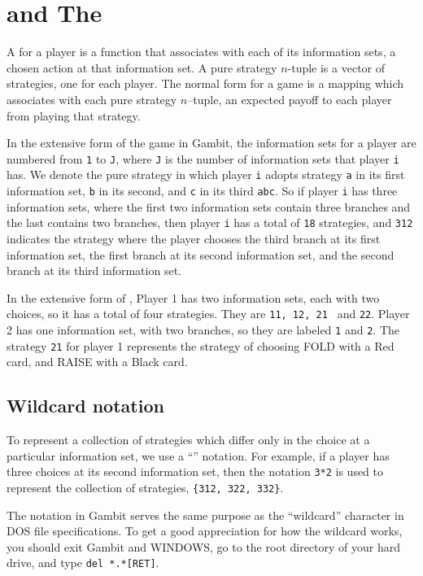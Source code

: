 \documentclass[12pt]{report}
\begin{document}
\section{ and The }

A  for a player is a function that 
associates with each of 
its information sets, a chosen action at that information set.  A pure 
strategy $n$-tuple is a vector of strategies, one for each player.  
The normal form for a game is a mapping which associates with each pure 
strategy $n$--tuple, an expected payoff to each player from 
playing that strategy. 

In the extensive form of the game in Gambit, the information sets for a 
player are numbered from \verb+1+ to \verb+J+, where \verb+J+ is the number of information 
sets that player \verb+i+ has.  We denote the pure strategy in which player \verb+i+ 
adopts strategy \verb+a+ in its first information set, \verb+b+ in its second, and 
\verb+c+ in its third \verb+abc+.  So if player \verb+i+ has three information sets, where 
the first two information sets contain three branches and the last contains 
two branches, then player \verb+i+ has a total of \verb+18+ strategies, 
and \verb+312+ indicates the strategy where the player chooses the third 
branch at its first information set, the first branch at its second 
information set, and the second branch at its third information set.  

In the extensive form of ,
Player 1 has two information sets, each with two choices, so it has a
total of four strategies.  They are {\tt 11, 12, 21 } and {\tt 22}.
Player 2 has one information set, with two branches, so they are
labeled {\tt 1} and {\tt 2}.  The strategy {\tt 21} for player 1
represents the strategy of choosing FOLD with a Red card, and RAISE
with a Black card.
 
\subsection{Wildcard notation}
To represent a collection of strategies which differ only in the choice at
a particular information set, we use a ``'' 
notation.  For example,
if a player has three choices at its second information set, then the 
notation {\tt 3*2} is used to represent the collection of strategies, 
{\tt \{312, 322, 332\}}.  

The {\tt *} notation in Gambit serves the same purpose as the ``wildcard'' 
character in DOS file specifications.  To get a good appreciation for how 
the wildcard works, you should exit Gambit and WINDOWS, go to the root 
directory of your hard drive, and type \verb+del *.*[RET]+.
\end{document}
